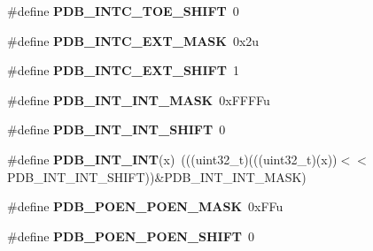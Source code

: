 \begin{DoxyCompactItemize}
\item 
\#define {\bfseries P\+D\+B\+\_\+\+I\+N\+T\+C\+\_\+\+T\+O\+E\+\_\+\+S\+H\+I\+FT}~0\hypertarget{group__PDB__Register__Masks_ga48ed5e2759aea8d4b6a4a47f1993cacc}{}\label{group__PDB__Register__Masks_ga48ed5e2759aea8d4b6a4a47f1993cacc}

\item 
\#define {\bfseries P\+D\+B\+\_\+\+I\+N\+T\+C\+\_\+\+E\+X\+T\+\_\+\+M\+A\+SK}~0x2u\hypertarget{group__PDB__Register__Masks_ga012fb0606d68eca77a9b15c2b8b8c995}{}\label{group__PDB__Register__Masks_ga012fb0606d68eca77a9b15c2b8b8c995}

\item 
\#define {\bfseries P\+D\+B\+\_\+\+I\+N\+T\+C\+\_\+\+E\+X\+T\+\_\+\+S\+H\+I\+FT}~1\hypertarget{group__PDB__Register__Masks_ga94b6fffc0fb61e58e2436696dc674340}{}\label{group__PDB__Register__Masks_ga94b6fffc0fb61e58e2436696dc674340}

\item 
\#define {\bfseries P\+D\+B\+\_\+\+I\+N\+T\+\_\+\+I\+N\+T\+\_\+\+M\+A\+SK}~0x\+F\+F\+F\+Fu\hypertarget{group__PDB__Register__Masks_ga04262fdbd8c3565c23a025cb119f1549}{}\label{group__PDB__Register__Masks_ga04262fdbd8c3565c23a025cb119f1549}

\item 
\#define {\bfseries P\+D\+B\+\_\+\+I\+N\+T\+\_\+\+I\+N\+T\+\_\+\+S\+H\+I\+FT}~0\hypertarget{group__PDB__Register__Masks_ga5b99cf0c9ae2fa2cf6e4200a7e3bf13b}{}\label{group__PDB__Register__Masks_ga5b99cf0c9ae2fa2cf6e4200a7e3bf13b}

\item 
\#define {\bfseries P\+D\+B\+\_\+\+I\+N\+T\+\_\+\+I\+NT}(x)~(((uint32\+\_\+t)(((uint32\+\_\+t)(x))$<$$<$P\+D\+B\+\_\+\+I\+N\+T\+\_\+\+I\+N\+T\+\_\+\+S\+H\+I\+FT))\&P\+D\+B\+\_\+\+I\+N\+T\+\_\+\+I\+N\+T\+\_\+\+M\+A\+SK)\hypertarget{group__PDB__Register__Masks_ga8b612d1c7684422f1c6b14cd069814ab}{}\label{group__PDB__Register__Masks_ga8b612d1c7684422f1c6b14cd069814ab}

\item 
\#define {\bfseries P\+D\+B\+\_\+\+P\+O\+E\+N\+\_\+\+P\+O\+E\+N\+\_\+\+M\+A\+SK}~0x\+F\+Fu\hypertarget{group__PDB__Register__Masks_gadff2842454cba42f94cc2568cd20df3d}{}\label{group__PDB__Register__Masks_gadff2842454cba42f94cc2568cd20df3d}

\item 
\#define {\bfseries P\+D\+B\+\_\+\+P\+O\+E\+N\+\_\+\+P\+O\+E\+N\+\_\+\+S\+H\+I\+FT}~0\hypertarget{group__PDB__Register__Masks_ga00643f248ccf8b14021f9983f0e32ac8}{}\label{group__PDB__Register__Masks_ga00643f248ccf8b14021f9983f0e32ac8}


\end{DoxyCompactItemize}
